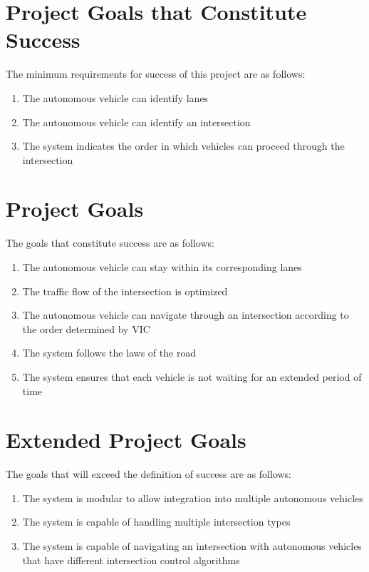 \documentclass [12pt]{article}
\begin{document}
\section{Project Goals that Constitute Success }
The minimum requirements for success of this project are as follows:
\begin{enumerate}
	\setlength\itemsep{-0.3em}
	\item The autonomous vehicle can identify lanes
	\item The autonomous vehicle can identify an intersection
	\item The system indicates the order in which vehicles can proceed through the intersection
\end{enumerate}

\section{Project Goals}
The goals that constitute success are as follows: 
\begin{enumerate}
	\setlength\itemsep{-0.3em}
	\item The autonomous vehicle can stay within its corresponding lanes
	\item The traffic flow of the intersection is optimized
	\item The autonomous vehicle can navigate through an intersection according to the order determined by VIC
	\item The system follows the laws of the road 
	\item The system ensures that each vehicle is not waiting for an extended period of time 
\end{enumerate}

\section{Extended Project Goals}
The goals that will exceed the definition of success are as follows: 
\begin{enumerate}
	\setlength\itemsep{-0.3em}
	\item The system is modular to allow integration into multiple autonomous vehicles
	\item The system is capable of handling multiple intersection types
	\item The system is capable of navigating an intersection with autonomous vehicles that have different intersection control algorithms
\end{enumerate}
\end{document}
